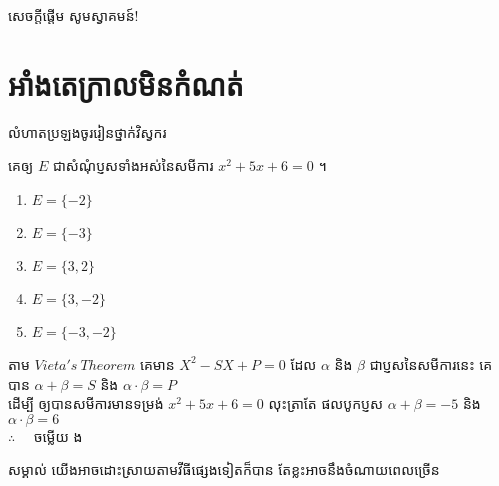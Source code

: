 \documentclass[12pt,xetex,serif]{beamer}
\begin{document}
	\begin{frame}
		\titlepage
	\end{frame}
	\begin{frame}{សេចក្តីផ្ដើម}
		\pause
		\centering \kml \huge \color{blue}សូមស្វាគមន៍!\\[.5ex]
		\color{magenta}{\tcfamily\scalebox{4}{6}}
	\end{frame}
	\section{អាំងតេក្រាលមិនកំណត់}
    \begin{frame}{លំហាតប្រឡងចូររៀនថ្នាក់វិស្វករ}
    	\pause
        \begin{example}
            \kb គេឲ្យ $E$ ជាសំណុំប្ញសទាំងអស់នៃសមីការ $x^2+5x+6=0$ ។ 
            \begin{multicols}{3}
            	\begin{enumerate}[a]
            		\item $E=\lbrace-2\rbrace$
            		\item $E=\lbrace-3\rbrace$
            		\item $E=\lbrace3,2\rbrace$
            		\item $E=\lbrace3,-2\rbrace$
            		\item $E=\lbrace-3,-2\rbrace$
            	\end{enumerate}
            \end{multicols}
        \end{example}
        \pause
        \centering \kml{\answername}\kb
        \pause
        \begin{center}
        	តាម  $Vieta's~Theorem$ គេមាន $X^2-SX+P=0$ ដែល $\alpha$ និង $\beta$ ជាប្ញសនៃសមីការនេះ គេបាន $\alpha+\beta=S$ និង $\alpha\cdot\beta=P$ \\
        	ដើម្បី ឲ្យបានសមីការមានទម្រង់ $x^2+5x+6=0$ លុះត្រាតែ ផលបូកប្ញស $\alpha+\beta=-5$ និង $\alpha\cdot\beta=6$\\
        	$\therefore \quad$ \kml ចម្លើយ \kbk ង
        \end{center}
        \pause
        \kml សម្គាល់ \kb យើងអាចដោះស្រាយតាមវីធីផ្សេងទៀតក៏បាន តែខ្លះអាចនឹងចំណាយពេលច្រើន
    \end{frame}
\end{document}
